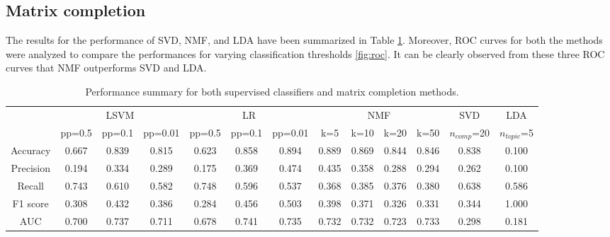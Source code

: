 \documentclass{article} %
\begin{document}
\subsection{Matrix completion}

The results for the performance of SVD, NMF, and LDA have been summarized in Table \ref{tab:standardresults}. Moreover, ROC curves for both the methods were analyzed to compare the performances for varying classification thresholds \ref{fig:roc}. It can be clearly observed from these three ROC curves that NMF outperforms SVD and LDA.

\begin{table}
\centering
{
\fontsize{6}{10}\selectfont
\noindent\begin{tabular}{ c | c c c | c c c | c c c c | c | c }
	\hline
	    & \multicolumn{3}{c|}{LSVM}
	    & \multicolumn{3}{c|}{LR}
	    & \multicolumn{4}{c|}{NMF}
	    & \multicolumn{1}{c|}{SVD}
	    & \multicolumn{1}{c}{LDA}\\
	\cline{2-11}
    & pp=0.5 & pp=0.1 & pp=0.01 & pp=0.5 & pp=0.1 & pp=0.01 & k=5 & k=10 & k=20 & k=50 & $n_{comp}$=20 & $n_{topic}$=5 \\
	\hline
	\hline
	Accuracy  & 0.667 & 0.839 & 0.815 & 0.623 & 0.858 & 0.894 & 0.889 & 0.869 & 0.844 & 0.846 & 0.838 & 0.100 \\
	\hline
	Precision & 0.194 & 0.334 & 0.289 & 0.175 & 0.369 & 0.474 & 0.435 & 0.358 & 0.288 & 0.294 & 0.262 & 0.100 \\
	\hline
	Recall    & 0.743 & 0.610 & 0.582 & 0.748 & 0.596 & 0.537 & 0.368 & 0.385 & 0.376 & 0.380 & 0.638 & 0.586 \\
	\hline
	F1 score  & 0.308 & 0.432 & 0.386 & 0.284 & 0.456 & 0.503 & 0.398 & 0.371 & 0.326 & 0.331 & 0.344 & 1.000 \\
	\hline
	AUC       & 0.700 & 0.737 & 0.711 & 0.678 & 0.741 & 0.735 & 0.732 & 0.732 & 0.723 & 0.733 & 0.298 & 0.181 \\
	\hline
\end{tabular}
}
\caption{\small Performance summary for both supervised classifiers and matrix completion methods.}
\label{tab:standardresults}
\end{table}
\end{document}
